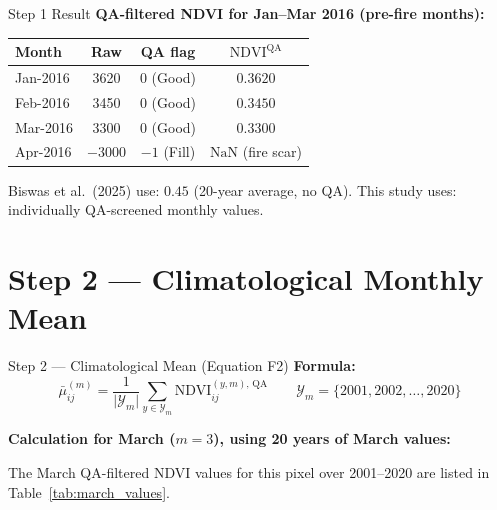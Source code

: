 \documentclass[12pt, a4paper]{article}
\begin{document}
\begin{resultbox}{Step 1 Result}
\textbf{QA-filtered NDVI for Jan--Mar 2016 (pre-fire months):}

\medskip
\begin{center}
\begin{tabular}{lccc}
\toprule
Month & Raw & QA flag & $\mathrm{NDVI}^{\mathrm{QA}}$ \\
\midrule
Jan-2016 & 3620  & 0 (Good)  & $\mathbf{0.3620}$ \\
Feb-2016 & 3450  & 0 (Good)  & $\mathbf{0.3450}$ \\
Mar-2016 & 3300  & 0 (Good)  & $\mathbf{0.3300}$ \\
Apr-2016 & $-3000$ & $-1$ (Fill) & $\mathbf{\mathrm{NaN}}$ (fire scar) \\
\bottomrule
\end{tabular}
\end{center}

\medskip
Biswas et al.\ (2025) use: $0.45$ (20-year average, no QA).
This study uses: individually QA-screened monthly values.
\end{resultbox}

\section{Step 2 --- Climatological Monthly Mean}
\label{sec:step2}

\begin{stepbox}{Step 2 --- Climatological Mean (Equation F2)}
\textbf{Formula:}
\begin{equation}
  \bar{\mu}_{ij}^{(m)} =
  \frac{1}{\lvert\mathcal{Y}_{m}\rvert}
  \sum_{y \in \mathcal{Y}_{m}}
  \mathrm{NDVI}_{ij}^{(y,m),\,\mathrm{QA}}
  \qquad
  \mathcal{Y}_{m} = \{2001, 2002, \ldots, 2020\}
  \tag{F2}
\end{equation}
\end{stepbox}

\textbf{Calculation for March ($m = 3$), using 20 years of March values:}

The March QA-filtered NDVI values for this pixel over 2001--2020 are
listed in Table~\ref{tab:march_values}.
\end{document}
